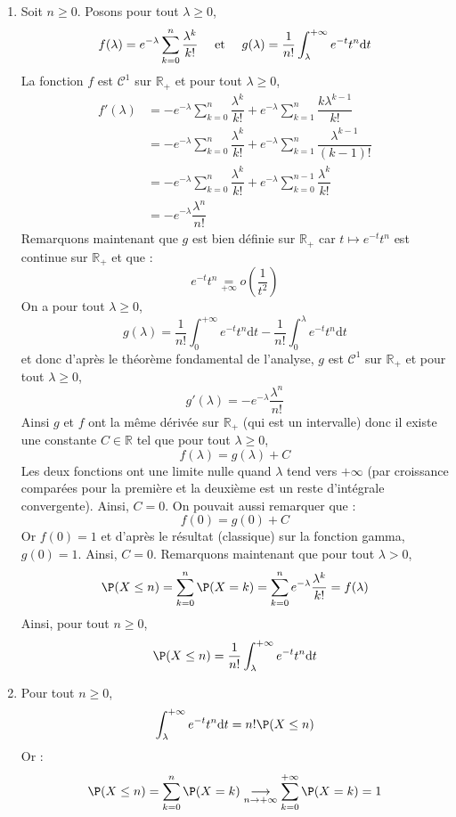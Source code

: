 \documentclass[a4paper,twoside,french,11pt]{VcCours}
\newcommand{\dt}{\text{d}t}
\begin{document}
\begin{enumerate}
\item Soit $n \geq 0$. Posons pour tout $\lambda  \geq 0$,
$$ f(\lambda) = e^{- \lambda} \sum_{k=0}^n  \dfrac{\lambda^k}{k!} \quad \hbox{ et } \quad g(\lambda) = \dfrac{1}{n!} \int_{\lambda}^{+ \infty} e^{-t} t^n \dt$$
La fonction $f$ est $\mathcal{C}^1$ sur $\mathbb{R}_+$ et pour tout $\lambda \geq 0$,
\begin{align*}
f'(\lambda) & = - e^{-\lambda} \sum_{k=0}^n  \dfrac{\lambda^k}{k!} + e^{-\lambda} \sum_{k=1}^n  \dfrac{k\lambda^{k-1}}{k!} \\
& = -e^{-\lambda} \sum_{k=0}^n  \dfrac{\lambda^k}{k!} + e^{-\lambda} \sum_{k=1}^n  \dfrac{\lambda^{k-1}}{(k-1)!} \\
& = -e^{-\lambda} \sum_{k=0}^n  \dfrac{\lambda^k}{k!} + e^{-\lambda} \sum_{k=0}^{n-1} \dfrac{\lambda^{k}}{k!} \\
& = -e^{-\lambda} \dfrac{\lambda^n}{n!}
\end{align*}
Remarquons maintenant que $g$ est bien définie sur $\mathbb{R}_+$ car $t \mapsto e^{-t}t^n$ est continue sur $\mathbb{R}_+$ et que :
$$ e^{-t} t^n \underset{+ \infty}{=}o \left( \dfrac{1}{t^2} \right)$$
On a pour tout $\lambda \geq 0$,
$$ g(\lambda) =\dfrac{1}{n!} \int_{0}^{+ \infty} e^{-t} t^n \dt - \dfrac{1}{n!} \int_{0}^{\lambda} e^{-t} t^n \dt$$
et donc d'après le théorème fondamental de l'analyse, $g$ est $\mathcal{C}^1$ sur $\mathbb{R}_+$ et pour tout $\lambda \geq 0$,
$$ g'(\lambda) = -e^{-\lambda} \dfrac{\lambda^n}{n!}$$
Ainsi $g$ et $f$ ont la même dérivée sur $\mathbb{R}_+$ (qui est un intervalle) donc il existe une constante $C \in \mathbb{R}$ tel que pour tout $\lambda \geq 0$,
$$ f(\lambda) = g(\lambda) + C$$
Les deux fonctions ont une limite nulle quand $\lambda$ tend vers $+ \infty$ (par croissance comparées pour la première et la deuxième est un reste d'intégrale  convergente). Ainsi, $C=0$. On pouvait aussi remarquer que :
$$ f(0) = g(0) + C$$
Or $f(0)=1$ et d'après le résultat (classique) sur la fonction gamma, $g(0)=1$. Ainsi, $C=0$. Remarquons maintenant que pour tout $\lambda>0$,
$$ \P(X \leq n) = \sum_{k=0}^n \P(X=k) = \sum_{k=0}^n e^{-\lambda} \dfrac{\lambda^k}{k!} = f(\lambda)$$
Ainsi, pour tout $n \geq 0$,
$$ \P(X \leq n) = \dfrac{1}{n!} \int_{\lambda}^{+ \infty} e^{-t} t^n \dt$$
\item Pour tout $n \geq 0$,
$$ \int_{\lambda}^{+ \infty} e^{-t} t^n \dt = n! \P(X \leq n)$$
Or :
$$ \P(X \leq n) = \sum_{k=0}^n \P(X=k) \underset{n \rightarrow + \infty}{\longrightarrow} \sum_{k=0}^{+ \infty} \P(X=k) = 1$$

\end{enumerate}
\end{document}
